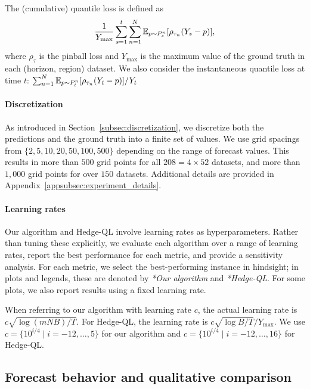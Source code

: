 The (cumulative) quantile loss is defined as
\[
\frac{1}{Y_{\text{max}}}\sum_{s=1}^t \sum_{n=1}^N \mathbb{E}_{p \sim P_s^n} [\rho_{\tau_n}(Y_s - p)],
\]
where $\rho_{\tau}$ is the pinball loss and $Y_{\text{max}}$ is the maximum value of the ground truth in each (horizon, region) dataset. 
We also consider the instantaneous quantile loss at time $t$: $\sum_{n=1}^N \mathbb{E}_{p \sim P_t^n} [\rho_{\tau_n}(Y_t - p)] / Y_t$

\paragraph{Discretization}
As introduced in Section~\ref{subsec:discretization}, we discretize both the predictions and the ground truth into a finite set of values. 
We use grid spacings from $\{2,5,10,20,50,100,500\}$ depending on the range of forecast values. 
This results in more than $500$ grid points for all $208 = 4 \times 52$ datasets, and more than $1{,}000$ grid points for over $150$ datasets. 
Additional details are provided in Appendix~\ref{appsubsec:experiment_details}.

\paragraph{Learning rates}
Our algorithm and Hedge-QL involve learning rates as hyperparameters. 
Rather than tuning these explicitly, we evaluate each algorithm over a range of learning rates, report the best performance for each metric, and provide a sensitivity analysis. 
For each metric, we select the best-performing instance in hindsight; in plots and legends, these are denoted by \textit{*Our algorithm} and \textit{*Hedge-QL}. 
For some plots, we also report results using a fixed learning rate.

When referring to our algorithm with learning rate $c$, the actual learning rate is $c \sqrt{\log (mNB) / T}$. 
For Hedge-QL, the learning rate is $c \sqrt{\log B / T} / Y_{\text{max}}$. 
We use $c=\{10^{i/4} \mid i=-12,\ldots,5\}$ for our algorithm and $c=\{10^{i/4} \mid i=-12,\ldots,16\}$ for Hedge-QL.


\subsection{Forecast behavior and qualitative comparison}

